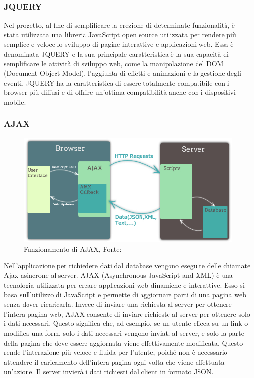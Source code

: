 \documentclass[a4paper,final,12pt]{report}
\begin{document}
\subsubsection{JQUERY}
Nel progetto, al fine di semplificare la crezione di determinate funzionalità, è stata utilizzata una libreria JavaScript open source utilizzata per rendere più semplice e veloce lo sviluppo di pagine interattive e applicazioni web. Essa è denominata JQUERY e la sua principale caratteristica è la sua capacità di semplificare le attività di sviluppo web, come la manipolazione del DOM (Document Object Model), l'aggiunta di effetti e animazioni e la gestione degli eventi. JQUERY ha la caratteristica di essere totalmente compatibile con i browser più diffusi e di offrire un'ottima compatibilità anche con i dispositivi mobile.
\subsubsection{AJAX}
\begin{figure}[hbtp]
\centering
\includegraphics[scale=0.40]{img_concettuale/ajax.jpg}
\caption{Funzionamento di AJAX, Fonte: \cite{javascript-coder}}
\end{figure} 
Nell'applicazione per richiedere dati dal database vengono eseguite delle chiamate Ajax asincrone al server. AJAX (Asynchronous JavaScript and XML) è una tecnologia utilizzata per creare applicazioni web dinamiche e interattive. Esso si basa sull'utilizzo di JavaScript e permette di aggiornare parti di una pagina web senza dover ricaricarla.
Invece di inviare una richiesta al server per ottenere l'intera pagina web, AJAX consente di inviare richieste al server per ottenere solo i dati necessari. Questo significa che, ad esempio, se un utente clicca su un link o modifica una form, solo i dati necessari vengono inviati al server, e solo la parte della pagina che deve essere aggiornata viene effettivamente modificata. Questo rende l'interazione più veloce e fluida per l'utente, poiché non è necessario attendere il caricamento dell'intera pagina ogni volta che viene effettuata un'azione.
Il server invierà i dati richiesti dal client in formato JSON.
\end{document}
